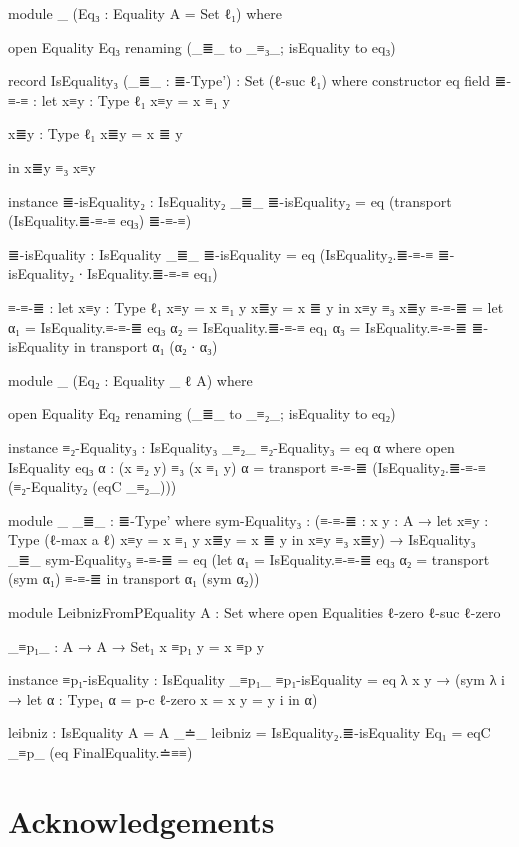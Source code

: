 \documentclass{article}
\begin{document}
\begin{code}

    module _
      (Eq₃ : Equality {A = Set ℓ₁})
      where

      open Equality Eq₃ renaming (_≣_ to _≡₃_; isEquality to eq₃)

      record IsEquality₃ (_≣_ : ≣-Type') : Set (ℓ-suc ℓ₁) where
        constructor eq
        field
          ≣-≡-≡ : let
            x≡y : Type ℓ₁
            x≡y = x ≡₁ y

            x≣y : Type ℓ₁
            x≣y = x ≣ y

            in x≣y ≡₃ x≡y

        instance
          ≣-isEquality₂ : IsEquality₂ _≣_
          ≣-isEquality₂ = eq (transport (IsEquality.≣-≡-≡ eq₃) ≣-≡-≡)

          ≣-isEquality : IsEquality _≣_
          ≣-isEquality = eq (IsEquality₂.≣-≡-≡ ≣-isEquality₂ ∙ IsEquality.≣-≡-≡ eq₁)

        ≡-≡-≣ : let
          x≡y : Type ℓ₁
          x≡y = x ≡₁ y
          x≣y = x ≣ y
          in x≡y ≡₃ x≣y
        ≡-≡-≣ = let
          α₁ = IsEquality.≡-≡-≣ eq₃
          α₂ = IsEquality.≣-≡-≡ eq₁
          α₃ = IsEquality.≡-≡-≣ ≣-isEquality
          in transport α₁ (α₂ ∙ α₃)

      module _
        (Eq₂ : Equality {_} {ℓ} {A})
        where

        open Equality Eq₂ renaming (_≣_ to _≡₂_; isEquality to eq₂)

        instance
          ≡₂-Equality₃ : IsEquality₃ _≡₂_
          ≡₂-Equality₃ = eq α
            where
              open IsEquality eq₃
              α : (x ≡₂ y) ≡₃ (x ≡₁ y)
              α = transport ≡-≡-≣ (IsEquality₂.≣-≡-≡ (≡₂-Equality₂ (eqC _≡₂_)))

      module _ {_≣_ : ≣-Type'} where
        sym-Equality₃ : (≡-≡-≣ : {x y : A} → let
          x≡y : Type (ℓ-max a ℓ)
          x≡y = x ≡₁ y
          x≣y = x ≣ y
          in x≡y ≡₃ x≣y)
          → IsEquality₃ _≣_
        sym-Equality₃ ≡-≡-≣ = eq (let
          α₁ = IsEquality.≡-≡-≣ eq₃
          α₂ = transport (sym α₁) ≡-≡-≣
          in transport α₁ (sym α₂))

module LeibnizFromPEquality {A : Set} where
  open Equalities {ℓ-zero} {ℓ-suc ℓ-zero}

  _≡p₁_ : A → A → Set₁
  x ≡p₁ y = x ≡p y

  instance
    ≡p₁-isEquality : IsEquality _≡p₁_
    ≡p₁-isEquality = eq λ {x y} → (sym λ i → let
      α : Type₁
      α = p-c {ℓ-zero} {x = x} {y = y} i
      in α)

  leibniz : IsEquality {A = A} _≐_
  leibniz =
    IsEquality₂.≣-isEquality {Eq₁ = eqC _≡p_} (eq FinalEquality.≐≡≡)

\end{code}

\section*{Acknowledgements}



\end{document}
